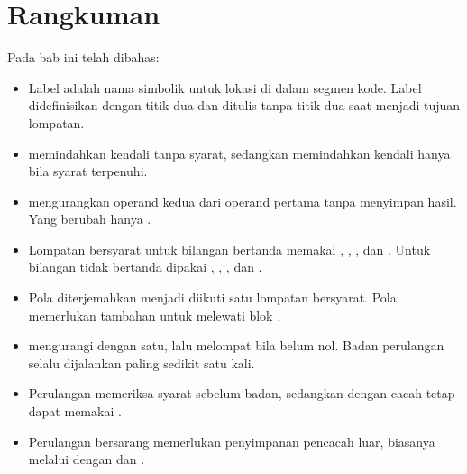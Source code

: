 \section{Rangkuman}
\label{sec:rangkuman-bab13}

Pada bab ini telah dibahas:

\begin{itemize}
    \item Label adalah nama simbolik untuk lokasi di dalam segmen
          kode. Label didefinisikan dengan titik dua dan ditulis
          tanpa titik dua saat menjadi tujuan lompatan.

    \item {} memindahkan kendali tanpa syarat, sedangkan
           memindahkan kendali hanya bila syarat
           terpenuhi.

    \item {} mengurangkan operand kedua dari operand pertama
          tanpa menyimpan hasil. Yang berubah hanya .

    \item Lompatan bersyarat untuk bilangan bertanda memakai
          , , , dan . Untuk
          bilangan tidak bertanda dipakai , ,
          , dan .

    \item Pola  diterjemahkan menjadi  diikuti
          satu lompatan bersyarat. Pola  memerlukan
          tambahan  untuk melewati blok .

    \item {} mengurangi  dengan satu, lalu melompat
          bila  belum nol. Badan perulangan selalu dijalankan
          paling sedikit satu kali.

    \item Perulangan  memeriksa syarat sebelum badan,
          sedangkan  dengan cacah tetap dapat memakai
          .

    \item Perulangan bersarang memerlukan penyimpanan pencacah luar,
          biasanya melalui  dengan  dan
          .
\end{itemize}

